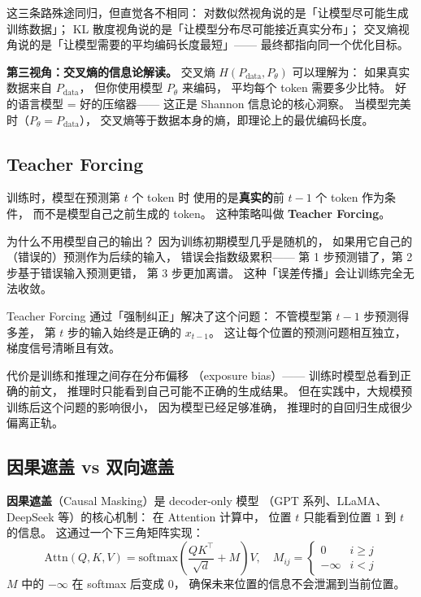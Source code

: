 这三条路殊途同归，但直觉各不相同：
对数似然视角说的是「让模型尽可能生成训练数据」；
KL 散度视角说的是「让模型分布尽可能接近真实分布」；
交叉熵视角说的是「让模型需要的平均编码长度最短」——
最终都指向同一个优化目标。

\textbf{第三视角：交叉熵的信息论解读。}
交叉熵 $H(P_{\mathrm{data}}, P_\theta)$ 可以理解为：
如果真实数据来自 $P_{\mathrm{data}}$，
但你使用模型 $P_\theta$ 来编码，
平均每个 token 需要多少比特。
好的语言模型 = 好的压缩器——
这正是 Shannon 信息论的核心洞察。
当模型完美时（$P_\theta = P_{\mathrm{data}}$），
交叉熵等于数据本身的熵，即理论上的最优编码长度。

\subsection{Teacher Forcing}

训练时，模型在预测第 $t$ 个 token 时
使用的是\textbf{真实的}前 $t-1$ 个 token 作为条件，
而不是模型自己之前生成的 token。
这种策略叫做 \textbf{Teacher Forcing}。

为什么不用模型自己的输出？
因为训练初期模型几乎是随机的，
如果用它自己的（错误的）预测作为后续的输入，
错误会指数级累积——
第 1 步预测错了，第 2 步基于错误输入预测更错，
第 3 步更加离谱。
这种「误差传播」会让训练完全无法收敛。

Teacher Forcing 通过「强制纠正」解决了这个问题：
不管模型第 $t-1$ 步预测得多差，
第 $t$ 步的输入始终是正确的 $x_{t-1}$。
这让每个位置的预测问题相互独立，
梯度信号清晰且有效。

代价是训练和推理之间存在分布偏移
（exposure bias）——
训练时模型总看到正确的前文，
推理时只能看到自己可能不正确的生成结果。
但在实践中，大规模预训练后这个问题的影响很小，
因为模型已经足够准确，
推理时的自回归生成很少偏离正轨。

\subsection{因果遮盖 vs 双向遮盖}

\textbf{因果遮盖}（Causal Masking）是 decoder-only 模型
（GPT 系列、LLaMA、DeepSeek 等）的核心机制：
在 Attention 计算中，
位置 $t$ 只能看到位置 $1$ 到 $t$ 的信息。
这通过一个下三角矩阵实现：
\begin{equation}
  \mathrm{Attn}(Q, K, V) = \mathrm{softmax}\left(
    \frac{QK^\top}{\sqrt{d}} + M
  \right) V, \quad
  M_{ij} = \begin{cases} 0 & i \geq j \\ -\infty & i < j \end{cases}
\end{equation}
$M$ 中的 $-\infty$ 在 softmax 后变成 0，
确保未来位置的信息不会泄漏到当前位置。

